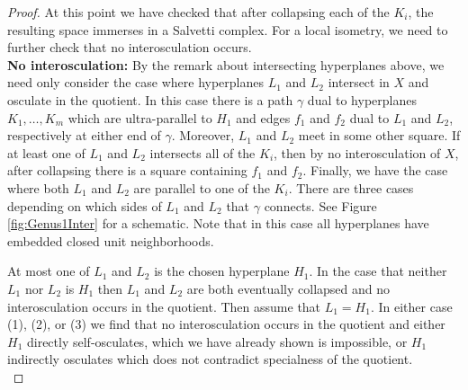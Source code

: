 \documentclass[11pt]{amsart}
\numberwithin{thm}{section}
\theoremstyle{remark}
\theoremstyle{definition}
\begin{document}
\begin{proof}
At this point we have checked that after collapsing each of the $K_i$, the resulting space immerses in a Salvetti complex.  For a local isometry, we need to further check that no interosculation occurs.  \\

\noindent
\textbf{No interosculation:} By the remark about intersecting hyperplanes above, we need only consider the case where hyperplanes $L_1$ and $L_2$ intersect in $X$ and osculate in the quotient.  In this case there is a path $\gamma$ dual to hyperplanes $K_1,\ldots,K_m$ which are ultra-parallel to $H_1$ and edges $f_1$ and $f_2$ dual to $L_1$ and $L_2$, respectively at either end of $\gamma$.  Moreover, $L_1$ and $L_2$ meet in some other square. If at least one of $L_1$ and $L_2$ intersects all of the $K_i$, then by no interosculation of $X$, after collapsing there is a square containing $f_1$ and $f_2$.   Finally, we have the case where both $L_1$ and $L_2$ are parallel to one of the $K_i$.  There are three cases depending on which sides of $L_1$ and $L_2$ that $\gamma$ connects. See Figure \ref{fig:Genus1Inter} for a schematic.  Note that in this case all hyperplanes have embedded closed unit neighborhoods.  

At most one of $L_1$ and $L_2$ is the chosen hyperplane $H_1$.  In the case that neither $L_1$ nor $L_2$ is $H_1$ then $L_1$ and $L_2$ are both eventually collapsed and no interosculation occurs in the quotient.  Then assume that $L_1=H_1$. In either case (1), (2), or (3) we find that no interosculation occurs in the quotient and either $H_1$ directly self-osculates, which we have already shown is impossible, or $H_1$ indirectly osculates which does not contradict specialness of the quotient.  \\



\end{proof}
\end{document}
